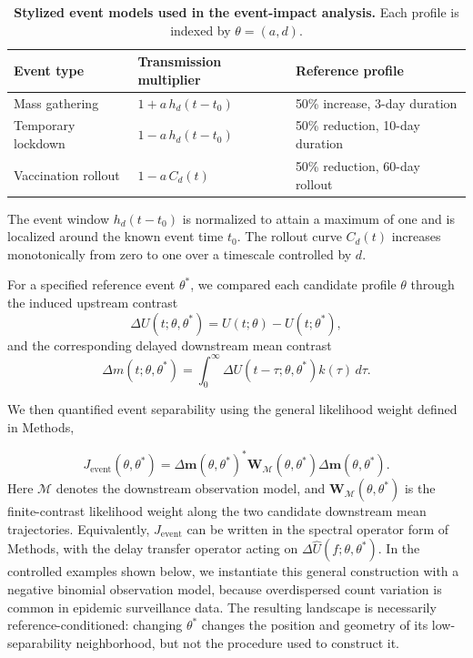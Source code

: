 \begin{table}[t]
\centering
\small
\caption{
\textbf{Stylized event models used in the event-impact analysis.}
Each profile is indexed by \(\theta=(a,d)\).
}
\label{tab:event-models}

\begin{tabular}{lll}
\toprule
Event type &
Transmission multiplier &
Reference profile
\\
\midrule

Mass gathering
&
\(
1+a\,h_d(t-t_0)
\)
&
50\% increase, 3-day duration
\\[5pt]

Temporary lockdown
&
$
1-a\,h_d(t-t_0)
$
&
50\% reduction, 10-day duration
\\[6pt]

Vaccination rollout
&
$
1-a\,C_d(t)
$
&
50\% reduction, 60-day rollout
\\

\bottomrule
\end{tabular}

\vspace{1mm}

\raggedright
\footnotesize
The event window $h_d(t-t_0)$ is normalized to attain a maximum of one and is localized around the known event time $t_0$. The rollout curve $C_d(t)$ increases monotonically from zero to one over a timescale controlled by $d$.
\end{table}

For a specified reference event \(\theta^\ast\), we compared each candidate profile \(\theta\) through the induced upstream contrast
\begin{equation}
\Delta U(t;\theta,\theta^\ast)
=
U(t;\theta)-U(t;\theta^\ast),
\end{equation}
and the corresponding delayed downstream mean contrast
\begin{equation}
\Delta m(t;\theta,\theta^\ast)
=
\int_0^\infty
\Delta U(t-\tau;\theta,\theta^\ast)k(\tau)\,d\tau .
\end{equation}


We then quantified event separability using the general likelihood weight defined in Methods,

\begin{equation}
J_{\mathrm{event}}(\theta,\theta^\ast)
=
\Delta\mathbf m(\theta,\theta^\ast)^*
\mathbf W_{\mathcal M}(\theta,\theta^\ast)
\Delta\mathbf m(\theta,\theta^\ast).
\label{eq:Jevent}
\end{equation}
Here \(\mathcal M\) denotes the downstream observation model, and \(\mathbf W_{\mathcal M}(\theta,\theta^\ast)\) is the finite-contrast likelihood weight along the two candidate downstream mean trajectories. Equivalently, \(J_{\mathrm{event}}\) can be written in the spectral operator form of Methods, with the delay transfer operator acting on \(\Delta\widehat U(f;\theta,\theta^\ast)\). In the controlled examples shown below, we instantiate this general construction with a negative binomial observation model, because overdispersed count variation is common in epidemic surveillance data. The resulting landscape is necessarily reference-conditioned: changing \(\theta^\ast\) changes the position and geometry of its low-separability neighborhood, but not the procedure used to construct it.

